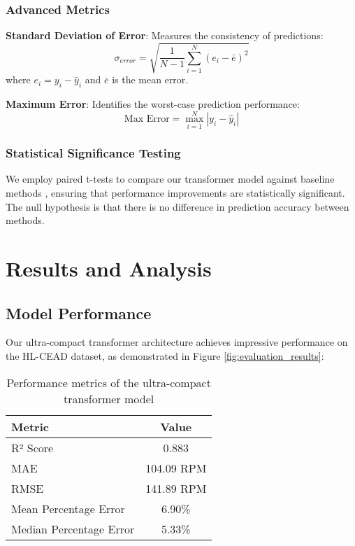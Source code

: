 \documentclass[journal,10pt]{IEEEtran}
\begin{document}
\subsubsection{Advanced Metrics}

\textbf{Standard Deviation of Error}: Measures the consistency of predictions:
\begin{equation}
\sigma_{error} = \sqrt{\frac{1}{N-1} \sum_{i=1}^{N} (e_i - \bar{e})^2}
\end{equation}
where $e_i = y_i - \hat{y}_i$ and $\bar{e}$ is the mean error.

\textbf{Maximum Error}: Identifies the worst-case prediction performance:
\begin{equation}
\text{Max Error} = \max_{i=1}^{N} |y_i - \hat{y}_i|
\end{equation}

\subsubsection{Statistical Significance Testing}

We employ paired t-tests to compare our transformer model against baseline methods \cite{PCT}, ensuring that performance improvements are statistically significant. The null hypothesis is that there is no difference in prediction accuracy between methods.

\section{Results and Analysis}

\subsection{Model Performance}

Our ultra-compact transformer architecture achieves impressive performance on the HL-CEAD dataset, as demonstrated in Figure \ref{fig:evaluation_results}:

\begin{table}[h]
\centering
\begin{tabular}{|l|c|}
\hline
\textbf{Metric} & \textbf{Value} \\
\hline
R² Score & 0.883 \\
MAE & 104.09 RPM \\
RMSE & 141.89 RPM \\
Mean Percentage Error & 6.90\% \\
Median Percentage Error & 5.33\% \\
\hline
\end{tabular}
\caption{Performance metrics of the ultra-compact transformer model}
\label{tab:performance}
\end{table}
\end{document}
